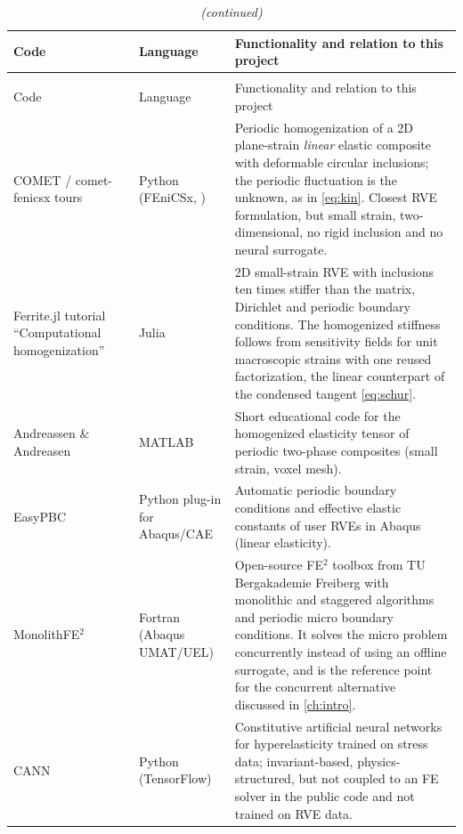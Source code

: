 {\small
\begin{xltabular}{\textwidth}{@{}p{3.1cm}p{1.9cm}X@{}}
\caption{Closest publicly available codes and their relation to this project.}\label{tab:available}\\
\toprule
Code & Language & Functionality and relation to this project\\
\midrule
\endfirsthead
\caption[]{\emph{(continued)}}\\
\toprule
Code & Language & Functionality and relation to this project\\
\midrule
\endhead
\bottomrule
\endfoot
COMET / comet-fenicsx tours~\cite{CometFenics} & Python (FEniCSx, ) &
  Periodic homogenization of a 2D plane-strain \emph{linear} elastic composite with
  deformable circular inclusions; the periodic fluctuation is the unknown, as in
  \cref{eq:kin}. Closest RVE formulation, but small strain, two-dimensional, no
  rigid inclusion and no neural surrogate.\\
Ferrite.jl tutorial ``Computational homogenization''~\cite{Ferrite} & Julia &
  2D small-strain RVE with inclusions ten times stiffer than the matrix, Dirichlet and
  periodic boundary conditions. The homogenized stiffness follows from sensitivity
  fields for unit macroscopic strains with one reused factorization, the linear
  counterpart of the condensed tangent \cref{eq:schur}.\\
Andreassen \& Andreasen~\cite{Andreassen2014} & MATLAB &
  Short educational code for the homogenized elasticity tensor of periodic
  two-phase composites (small strain, voxel mesh).\\
EasyPBC~\cite{Omairey2019} & Python plug-in for Abaqus/CAE &
  Automatic periodic boundary conditions and effective elastic constants of
  user RVEs in Abaqus (linear elasticity).\\
MonolithFE$^2$~\cite{MonolithFE2} & Fortran (Abaqus UMAT/UEL) &
  Open-source FE$^2$ toolbox from TU Bergakademie Freiberg with monolithic and
  staggered algorithms and periodic micro boundary conditions. It solves the micro
  problem concurrently instead of using an offline surrogate, and is the reference
  point for the concurrent alternative discussed in \cref{ch:intro}.\\
CANN~\cite{Linka2021} & Python (TensorFlow) &
  Constitutive artificial neural networks for hyperelasticity trained on stress
  data; invariant-based, physics-structured, but not coupled to an FE solver in
  the public code and not trained on RVE data.\\

\end{xltabular}}
